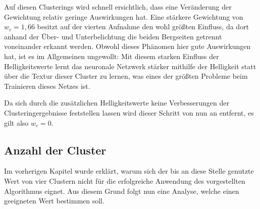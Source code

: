 Auf diesen Clusterings wird schnell ersichtlich, dass eine Veränderung der Gewichtung relativ geringe Auswirkungen hat. Eine stärkere Gewichtung von $w_c=1,66$ besitzt auf der vierten Aufnahme den wohl größten Einfluss, da dort anhand der Über- und Unterbelichtung die beiden Bergseiten getrennt voneinander erkannt werden. Obwohl dieses Phänomen hier gute Auswirkungen hat, ist es im Allgemeinen ungewollt: Mit diesem starken Einfluss der Helligkeitswerte lernt das neuronale Netzwerk stärker mithilfe der Helligkeit statt über die Textur dieser Cluster zu lernen, was eines der größten Probleme beim Trainieren dieses Netzes ist.

Da sich durch die zusätzlichen Helligkeitswerte keine Verbesserungen der Clusteringergebnisse feststellen lassen wird dieser Schritt von nun an entfernt, es gilt also $w_c=0$.

\subsection{Anzahl der Cluster}
\label{ssec:exp_number_of_segments}

Im vorherigen Kapitel wurde erklärt, warum sich der bis an diese Stelle genutzte Wert von vier Clustern nicht für die erfolgreiche Anwendung des vorgestellten Algorithmus eignet. Aus diesem Grund folgt nun eine Analyse, welche einen geeigneten Wert bestimmen soll.

